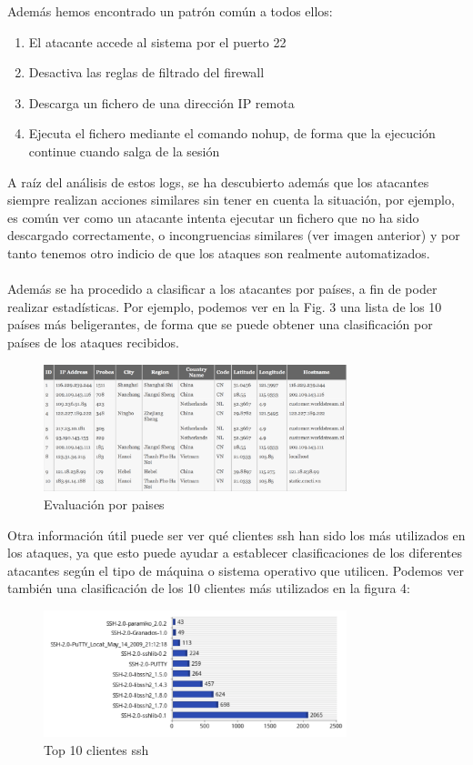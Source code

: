 \documentclass[journal]{IEEEtran}
\begin{document}
Además hemos encontrado un patrón común a todos ellos:
\begin{enumerate}
\item El atacante accede al sistema por el puerto 22
\item Desactiva las reglas de filtrado del firewall
\item Descarga un fichero de una dirección IP remota
\item Ejecuta el fichero mediante el comando nohup, de forma que la ejecución continue cuando salga de la sesión
\end{enumerate}
A raíz del análisis de estos logs, se ha descubierto además que los atacantes siempre realizan acciones similares sin tener en cuenta la situación, por ejemplo, es común ver como un atacante intenta ejecutar un fichero que no ha sido descargado correctamente, o incongruencias similares (ver imagen anterior) y por tanto tenemos otro indicio de que los ataques son realmente automatizados.
\\\\
Además se ha procedido a clasificar a los atacantes por países, a fin de poder realizar estadísticas. Por ejemplo, podemos ver en la Fig. 3 una lista de los 10 países más beligerantes, de forma que se puede obtener una clasificación por países de los ataques recibidos.
\begin{figure}[H]
\centerline{
\includegraphics[width=8.8cm]{img/country_profiling}
}
\caption{Evaluación por paises}
\label{fig:sesion_atacante}
\end{figure}
Otra información útil puede ser ver qué clientes ssh han sido los más utilizados en los ataques, ya que esto puede ayudar a establecer clasificaciones de los diferentes atacantes según el tipo de máquina o sistema operativo que utilicen. Podemos ver también una clasificación de los 10 clientes más utilizados en la figura 4:
\begin{figure}[H]
\centerline{
\includegraphics[width=8.8cm]{img/ssh}
}
\caption{Top 10 clientes ssh }
\label{fig:sesion_atacante}
\end{figure}
\end{document}
